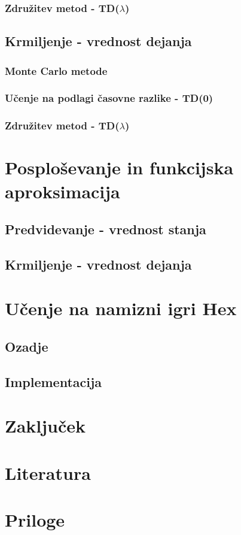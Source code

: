\documentclass[a4paper, oneside, 12pt]{article}
\begin{document}
\subsubsection{Združitev metod - TD($\lambda$)}
\subsection{Krmiljenje - vrednost dejanja}
\subsubsection{Monte Carlo metode}
\subsubsection{Učenje na podlagi časovne razlike - TD(0)}
\subsubsection{Združitev metod - TD($\lambda$)}
\newpage

\section{Posploševanje in funkcijska aproksimacija}
\subsection{Predvidevanje - vrednost stanja}
\subsection{Krmiljenje - vrednost dejanja}
\newpage

\section{Učenje na namizni igri Hex}
\subsection{Ozadje}
\subsection{Implementacija}
\newpage

\section{Zaključek}
\newpage

\section{Literatura}
\newpage

\section{Priloge}
\newpage
\end{document}
